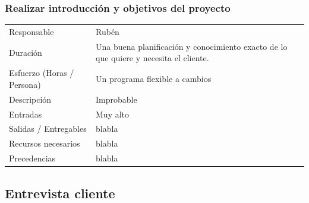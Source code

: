 \subsubsection{Realizar introducci\'{o}n y objetivos del proyecto}
\begin{table}[H]
    \begin{center}
        \begin{tabular}{l p{8cm}}
            Responsable                           & Rub\'{e}n \\
            Duraci\'{o}n                          & Una buena planificación y conocimiento exacto de lo que quiere y necesita el cliente. \\ 
            Esfuerzo (Horas / Persona)            & Un programa flexible a cambios \\
            Descripci\'{o}n                       & Improbable \\
            Entradas                              & Muy alto\\
            Salidas / Entregables                 & blabla \\
            Recursos necesarios                   & blabla \\
            Precedencias                          & blabla \\
        \end{tabular}
    \end{center}
    
\end{table}

\subsection{Entrevista cliente}

